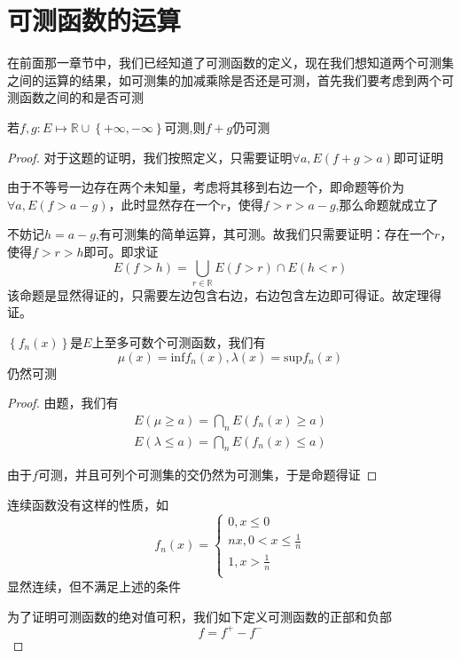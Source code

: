 \documentclass[lang=cn,14pt]{elegantbook}
\begin{document}
	\section{可测函数的运算}
	在前面那一章节中，我们已经知道了可测函数的定义，现在我们想知道两个可测集之间的运算的结果，如可测集的加减乘除是否还是可测，首先我们要考虑到两个可测函数之间的和是否可测
	\begin{theorem}
		若$f,g:E\longmapsto \mathbb{R} \cup \left\{ +\infty ,-\infty \right\} \text{可测}$,则$f+g$仍可测
	\end{theorem}
	\begin{proof}
		对于这题的证明，我们按照定义，只需要证明$\forall a,E(f+g>a)$即可证明
		
		由于不等号一边存在两个未知量，考虑将其移到右边一个，即命题等价为$\forall a,E(f>a-g)$，此时显然存在一个$r$，使得$f>r>a-g$,那么命题就成立了
		
		不妨记$h=a-g$,有可测集的简单运算，其可测。故我们只需要证明：存在一个$r$，使得$f>r>h$即可。即求证
		\begin{equation*}
			E\left( f>h \right) =\bigcup_{r\in \mathbb{R}}{E\left( f>r \right) \cap E\left( h<r \right)}
		\end{equation*}
		该命题是显然得证的，只需要左边包含右边，右边包含左边即可得证。故定理得证。
	\begin{theorem}
		$\left\{ f_n\left( x \right) \right\} \text{是}E\text{上至多可数个可测函数}$，我们有
		\begin{equation*}
			\mu \left( x \right) =\mathrm{inf} f_n\left( x \right) ,\lambda \left( x \right) =\mathrm{sup} f_n\left( x \right) 
		\end{equation*}
		仍然可测
	\end{theorem}
 	\begin{proof}
 		由题，我们有
 			\begin{equation*}
 				\begin{split}
 						E\left( \mu \ge a \right) =\bigcap_n{E\left( f_n\left( x \right) \ge a \right)}
 					\\
 					E\left( \lambda \le a \right) =\bigcap_n{E\left( f_n\left( x \right) \le a \right)}
 				\end{split}
 			\end{equation*}

 		由于$f$可测，并且可列个可测集的交仍然为可测集，于是命题得证
 	\end{proof}
	\begin{remark}
		连续函数没有这样的性质，如
		\begin{equation*}
			f_n\left( x \right) =\begin{cases}
				0,x\le 0\\
				nx,0<x\le \frac{1}{n}\\
				1,x>\frac{1}{n}\\
			\end{cases}
		\end{equation*}
		显然连续，但不满足上述的条件
	\end{remark}
	
	为了证明可测函数的绝对值可积，我们如下定义可测函数的正部和负部
	\begin{equation*}
		f=f^+ -f^-
	\end{equation*}
	\end{proof}
\end{document}
